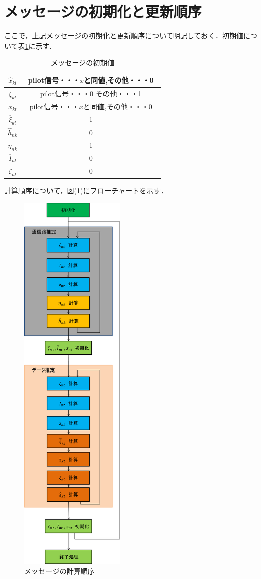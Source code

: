 \section{メッセージの初期化と更新順序}
ここで，上記メッセージの初期化と更新順序について明記しておく．初期値について表\ref{tb:init_Message}に示す.
\begin{table}[htb]
	\begin{center}
		\caption{メッセージの初期値\label{tb:init_Message}}
		\begin{tabular}{|c|c|} \hline
			$\hat{x}_{kt}$ & pilot信号・・・$x$と同値,その他・・・0　\\ \hline
			$\xi_{kt}$ & pilot信号・・・0 その他・・・1 \\ \hline
			$\overline{x}_{kt}$ & pilot信号・・・$x$と同値,その他・・・0　\\ \hline
			$\overline{\xi}_{kt}$ & 1 \\ \hline\hline
			$\hat{h}_{nk}$ & 0\\ \hline
			$\eta_{nk}$ & 1\\ \hline\hline
			$\overline{I}_{nt}$ & 0\\ \hline
			$\zeta_{nt}$ & 0\\ \hline
		\end{tabular}
	\end{center}
\end{table}

計算順序について，図(\ref{fig:flow_message})にフローチャートを示す．
\begin{figure}[htbp]
  \begin{center}
    \includegraphics[clip,width=5.0cm]{./flow_message.eps}
    \caption{メッセージの計算順序}
    \label{fig:flow_message}
  \end{center}
\end{figure}